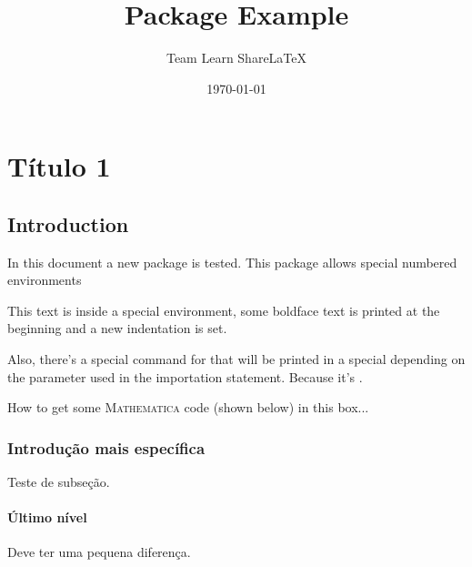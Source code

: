 \documentclass{book}
\title{Package Example}
\author{Team Learn ShareLaTeX}
\date{\today}
\begin{document}
\maketitle

\chapter{Título 1}
\section{Introduction}
In this document a new package is tested. This package allows special numbered environments

\begin{example}
This text is inside a special environment, some boldface text is printed
at the beginning and a new indentation is set.
\end{example}

Also, there's a special command for  that will be printed in a special  depending on the parameter used in the  importation statement. Because it's .

\begin{warning}
How to get some \textsc{Mathematica} code (shown below) in this box...\\
\lipsum[1][1]
\end{warning}

\subsection{Introdução mais específica}

Teste de subseção.

\subsubsection{Último nível}

Deve ter uma pequena diferença.

\printindex
\end{document}
